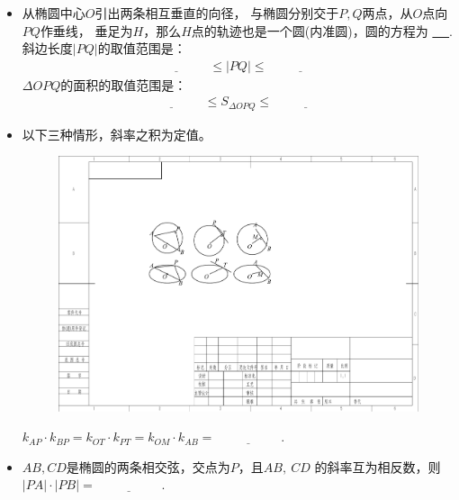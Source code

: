 \documentclass{article}
\newif\ifte
\renewcommand\leq\leqslant
\begin{document}
\begin{multicols}{2}
\begin{enumerate}[leftmargin=20pt]
\begin{itemize}[leftmargin=-4pt]
\item 从椭圆中心$ O $引出两条相互垂直的向径，
与椭圆分别交于$ P,Q $两点，从$ O $点向$ PQ $作垂线，
垂足为$ H $，那么$ H $点的轨迹也是一个圆(内准圆)，圆的方程为
\underline{\ \ifte $ x^2+y^2=\dfrac{a^2b^2}{a^2+b^2} $
    \else \hspace{3cm} \fi\ }.
斜边长度$ |PQ| $的取值范围是：
\begin{gather*}
    \underline{\ \ifte \dfrac{2ab}{\sqrt{a^2+b^2}} \else \hspace{2cm} \fi\ }
    \leq |PQ| \leq 
    \underline{\ \ifte \sqrt{a^2+b^2} \else \hspace{2cm} \fi\ }
\end{gather*}
$ \Delta OPQ $的面积的取值范围是：
\begin{gather*}
    \underline{\ \ifte \dfrac{a^2b^2}{a^2+b^2}\else \hspace{2cm} \fi\ }
    \leq S_{\Delta OPQ} \leq 
    \underline{\ \ifte \dfrac{1}{2}ab \else \hspace{2cm} \fi\ }
\end{gather*}

\item 以下三种情形，斜率之积为定值。
\begin{figure}[H]
    \centering
    \includegraphics[width=0.95\linewidth]{"椭圆-两直线斜率之积-删除圆"}
\end{figure}
$ k_{AP}\cdot k_{BP}=k_{OT}\cdot k_{PT}=k_{OM}\cdot k_{AB}=
\underline{\ \ifte -\dfrac{b^2}{a^2}\else \hspace{2cm} \fi\ } $.

\item $AB,CD$是椭圆的两条相交弦，交点为$P$，且$ AB,\ CD $
的斜率互为相反数，则$ |PA|\cdot|PB|=\underline{\ \ifte 
    |PC|\cdot|PD| \else \hspace{2cm} \fi\ } $. 


\end{itemize}
\end{enumerate}
\end{multicols}
\end{document}
